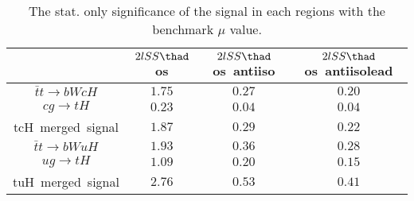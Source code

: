 \begin{table}
\footnotesize
\caption{The stat. only significance of the signal in each regions with the benchmark $\mu$ value.}
\centering
\begin{tabular}{|c|c|c|c|} \hline
 & $2lSS\thad$ os & $2lSS\thad$ os~antiiso & $2lSS\thad$ os~antiisolead\\\hline
$\bar{t}t\to bWcH$ & $1.75$ & $0.27$ & $0.20$\\\hline
$cg\to tH$ & $0.23$ & $0.04$ & $0.04$\\\hline
tcH~merged~signal & $1.87$ & $0.29$ & $0.22$\\\hline
$\bar{t}t\to bWuH$ & $1.93$ & $0.36$ & $0.28$\\\hline
$ug\to tH$ & $1.09$ & $0.20$ & $0.15$\\\hline
tuH~merged~signal & $2.76$ & $0.53$ & $0.41$\\\hline
\end{tabular}
\label{tab:significance}
\end{table}

